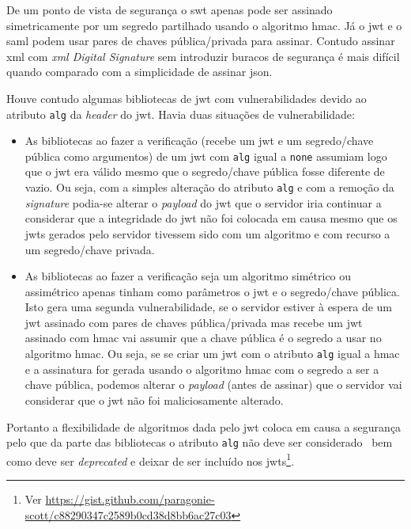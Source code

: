 De um ponto de vista de segurança o \acrshort{swt} apenas pode ser assinado simetricamente por um segredo partilhado usando o algoritmo \acrshort{hmac}. Já o \acrshort{jwt} e o \acrshort{saml} podem usar pares de chaves pública/privada para assinar. Contudo assinar \acrshort{xml} com \textit{\acrshort{xml} Digital Signature} sem introduzir buracos de segurança é mais difícil quando comparado com a simplicidade de assinar \acrshort{json}.~\cite{jwtio}

Houve contudo algumas bibliotecas de \acrshort{jwt} com vulnerabilidades devido ao atributo \texttt{alg} da \textit{header} do \acrshort{jwt}. Havia duas situações de vulnerabilidade:
\begin{itemize}
    \item As bibliotecas ao fazer a verificação (recebe um \acrshort{jwt} e um segredo/chave pública como argumentos) de um \acrshort{jwt} com \texttt{alg} igual a \texttt{none} assumiam logo que o \acrshort{jwt} era válido mesmo que o segredo/chave pública fosse diferente de vazio. Ou seja, com a simples alteração do atributo \texttt{alg} e com a remoção da \textit{signature} podia-se alterar o \textit{payload} do \acrshort{jwt} que o servidor iria continuar a considerar que a integridade do \acrshort{jwt} não foi colocada em causa mesmo que os \acrshort{jwt}s gerados pelo servidor tivessem sido com um algoritmo e com recurso a um segredo/chave privada.
    \item As bibliotecas ao fazer a verificação seja um algoritmo simétrico ou assimétrico apenas tinham como parâmetros o \acrshort{jwt} e o segredo/chave pública. Isto gera uma segunda vulnerabilidade, se o servidor estiver à espera de um \acrshort{jwt} assinado com pares de chaves pública/privada mas recebe um \acrshort{jwt} assinado com \acrshort{hmac} vai assumir que a chave pública é o segredo a usar no algoritmo \acrshort{hmac}. Ou seja, se se criar um \acrshort{jwt} com o atributo \texttt{alg} igual a \acrshort{hmac} e a assinatura for gerada usando o algoritmo \acrshort{hmac} com o segredo a ser a chave pública, podemos alterar o \textit{payload} (antes de assinar) que o servidor vai considerar que o \acrshort{jwt} não foi maliciosamente alterado.
\end{itemize}

Portanto a flexibilidade de algoritmos dada pelo \acrshort{jwt} coloca em causa a segurança pelo que da parte das bibliotecas o atributo \texttt{alg} não deve ser considerado~\cite{jwtvuln} bem como deve ser \textit{deprecated} e deixar de ser incluído nos \acrshort{jwt}s\footnote{Ver \url{https://gist.github.com/paragonie-scott/c88290347c2589b0cd38d8bb6ac27c03}}. 

